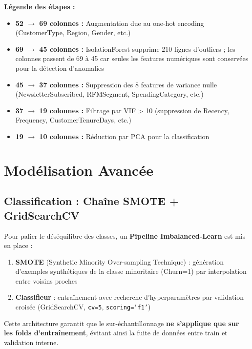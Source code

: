 \documentclass[11pt,a4paper]{article}
\begin{document}
\textbf{Légende des étapes :}
\begin{itemize}[label=\color{headerblue}$\bullet$]
    \item \textbf{52 $\rightarrow$ 69 colonnes :} Augmentation due au one-hot encoding (CustomerType, Region, Gender, etc.)
    \item \textbf{69 $\rightarrow$ 45 colonnes :} IsolationForest supprime 210 lignes d'outliers ; les colonnes passent de 69 à 45 car seules les features numériques sont conservées pour la détection d'anomalies
    \item \textbf{45 $\rightarrow$ 37 colonnes :} Suppression des 8 features de variance nulle (NewsletterSubscribed, RFMSegment, SpendingCategory, etc.)
    \item \textbf{37 $\rightarrow$ 19 colonnes :} Filtrage par VIF > 10 (suppression de Recency, Frequency, CustomerTenureDays, etc.)
    \item \textbf{19 $\rightarrow$ 10 colonnes :} Réduction par PCA pour la classification
\end{itemize}
   

\section{Modélisation Avancée}

\subsection{Classification : Chaîne SMOTE + GridSearchCV}

Pour palier le déséquilibre des classes, un \textbf{Pipeline Imbalanced-Learn} est mis en place :
\begin{enumerate}
    \item \textbf{SMOTE} (Synthetic Minority Over-sampling Technique) : génération d'exemples synthétiques de la classe minoritaire (Churn=1) par interpolation entre voisins proches
    \item \textbf{Classifieur} : entraînement avec recherche d'hyperparamètres par validation croisée (GridSearchCV, \texttt{cv=5}, \texttt{scoring='f1'})
\end{enumerate}

Cette architecture garantit que le sur-échantillonnage \textbf{ne s'applique que sur les folds d'entraînement}, évitant ainsi la fuite de données entre train et validation interne.
\end{document}
